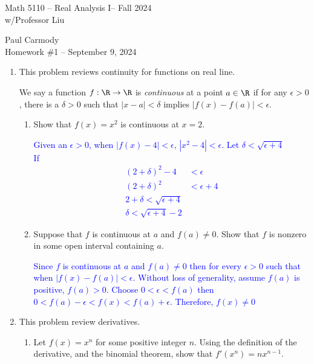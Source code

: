 \documentclass[10pt,a4paper]{report}
\newcommand{\CLASSNAME}{Math 5110 -- Real Analysis I}
\newcommand{\STUDENTNAME}{Paul Carmody}
\newcommand{\ASSIGNMENT}{Homework \#1 }
\newcommand{\DUEDATE}{September 9, 2024}
\newcommand{\SEMESTER}{Fall 2024}
\newcommand{\BLUE}[1]{\textcolor{blue}{#1}}
\begin{document}
\begin{center}
	\Large{\CLASSNAME -- \SEMESTER} \\
	\large{ w/Professor Liu}
\end{center}
\begin{center}
	\STUDENTNAME \\
	\ASSIGNMENT -- \DUEDATE\\
\end{center} 

\begin{enumerate}[label=\Roman*.]
\item This problem reviews continuity for functions on real line.

We say a function $f: \R \to \R$ is \textit{continuous} at a point $a \in \R$ if for any $\epsilon > 0$, there is a $\delta > 0$ such that $|x-a| < \delta$ implies $|f(x)-f(a)|< \epsilon$.
\begin{enumerate}[label=(\alph*)]
\item Show that $f(x)=x^2$ is continuous at $x=2$.

\BLUE{Given an $\epsilon > 0$, when $|f(x)-4|< \epsilon$, $ |x^2 -4| < \epsilon$.  Let $\delta < \sqrt{\epsilon + 4}$ \\
If \begin{align*}
	(2+\delta)^2-4 &< \epsilon \\
	(2+\delta)^2&< \epsilon +4\\
	2+\delta < \sqrt{\epsilon +4} \\
	\delta < \sqrt{\epsilon+4}-2
\end{align*} }

\item Suppose that $f$ is continuous at $a$ and $f(a) \ne 0$. Show that $f$ is nonzero in some open interval containing $a$.

\BLUE{Since $f$ is continuous at $a$ and $f(a) \ne 0$ then for every $\epsilon > 0$ such that when $|f(x)-f(a)| < \epsilon$.  Without loss of generality, assume $f(a)$ is positive, $f(a) > 0$.  Choose $0<\epsilon < f(a)$ then $0 < f(a)-\epsilon < f(x) < f(a) + \epsilon$.  Therefore, $f(x) \ne 0$ }

\end{enumerate}
\newpage
\item This problem review derivatives.
\begin{enumerate}[label=(\alph*)]
\item Let $f(x)=x^n$ for some positive integer $n$.  Using the definition of the derivative, and the binomial theorem, show that $f'(x^n) = nx^{n-1}$.


\end{enumerate}
\end{enumerate}
\end{document}
